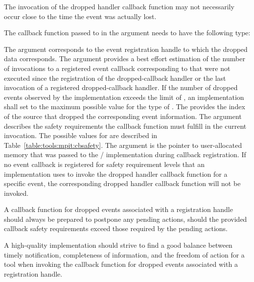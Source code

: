 \begin{users}
    The invocation of the dropped handler callback function may not necessarily occur 
    close to the time the event was actually lost.
\end{users}


The callback function passed to  in
the argument  needs to have the following
type:


The argument  corresponds to the event
registration handle to which the dropped data corresponds. The argument
 provides a best effort estimation of the number of
invocations to a registered event callback corresponding to
 that were not executed since the registration
of the dropped-callback handler or the last invocation of a registered 
dropped-callback handler.  If the number of dropped events observed by the
implementation exceeds the limit of , an
implementation shall set  to the maximum possible value for the type of .  The
 provides the index of the source that dropped the
corresponding event information. The argument  describes
the safety requirements the callback function must fulfill in the current
invocation.  The possible values for  are described in
Table~\ref{table:tools:mpit:cbsafety}. The argument  is
the pointer to user-allocated memory that was passed to the \MPI/
implementation during callback registration.  If no event callback is
registered for safety requirement levels that an implementation uses to invoke
the dropped handler callback function for a specific event, the corresponding
dropped handler callback function will not be invoked.

\begin{users}
    A callback function for dropped events associated with a registration
    handle should always be prepared to postpone any pending actions,
    should the provided callback safety requirements exceed those required
    by the pending actions.
\end{users}

\begin{implementors}
    A high-quality implementation should strive to find a good balance between
    timely notification, completeness of information, and the freedom of action
    for a tool when invoking the callback function for dropped events associated
    with a registration handle.
\end{implementors}

